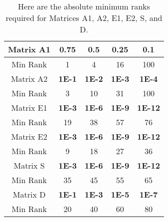 
\begin{table}
\begin{center}
\begin{tabular}{|c|c|c|c|c|}
\hline
Matrix A1 & \textbf{0.75} & \textbf{0.5} & \textbf{0.25} & \textbf{0.1} \\
\hline
Min Rank  & 1 & 4 & 16 & 100 \\
\hline
\hline
Matrix A2 & \textbf{1E-1} & \textbf{1E-2} & \textbf{1E-3} & \textbf{1E-4} \\
\hline
Min Rank  & 3 & 10 & 31 & 100 \\
\hline
\hline
Matrix E1 & \textbf{1E-3} & \textbf{1E-6} & \textbf{1E-9} & \textbf{1E-12} \\
\hline
Min Rank  & 19 & 38 & 57 & 76 \\
\hline
\hline
Matrix E2 & \textbf{1E-3} & \textbf{1E-6} & \textbf{1E-9} & \textbf{1E-12} \\
\hline
Min Rank  & 9 & 18 & 27 & 36 \\
\hline
\hline
Matrix S  & \textbf{1E-3} & \textbf{1E-6} & \textbf{1E-9} & \textbf{1E-12} \\
\hline
Min Rank  & 35 & 45 & 55 & 65 \\
\hline
\hline
Matrix D  & \textbf{1E-1} & \textbf{1E-3} & \textbf{1E-5} & \textbf{1E-7} \\
\hline
Min Rank  & 20 & 40 & 60 & 80 \\
\hline
\hline
\end{tabular}
\end{center}
\caption[QB Adaptive Test: Minimum Rank]{
Here are the absolute minimum ranks required
for Matrices A1, A2, E1, E2, S, and D.
}
\label{tab:results_qb_min_rank}
\end{table}
